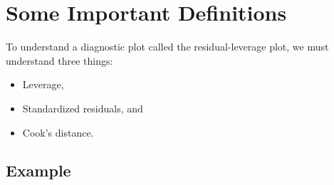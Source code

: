 \documentclass[residuals.tex]{subfiles}
\begin{document}
\newpage
\Large
\section{Some Important Definitions}

To understand a diagnostic plot called the residual-leverage plot, we must understand three things:

\begin{itemize}
	\item Leverage,
	\item Standardized residuals, and
	\item Cook's distance.
\end{itemize}
\newpage




\subsection*{Example}
\end{document}
